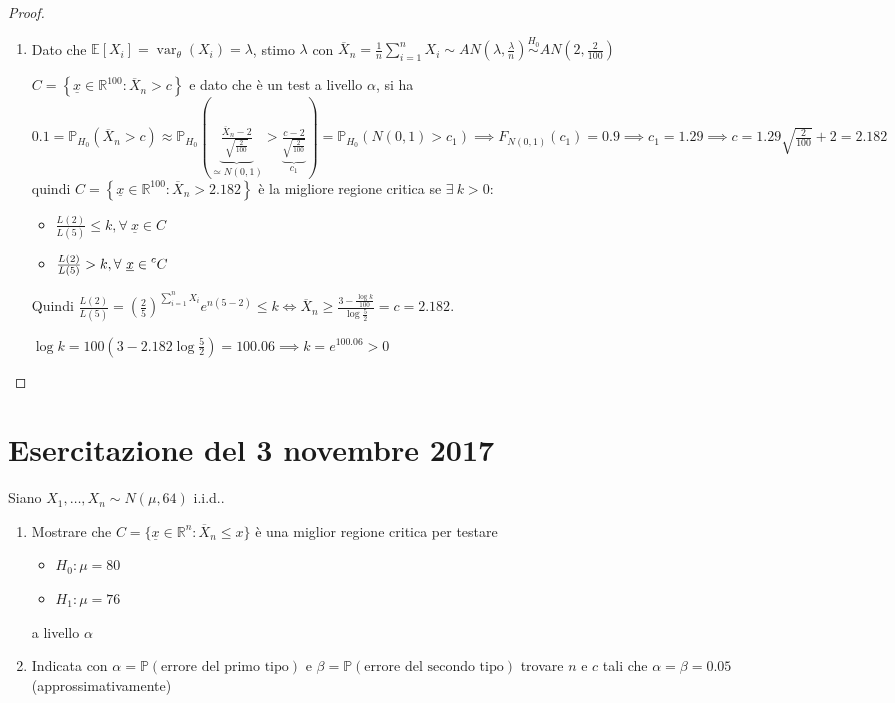 \documentclass[hidelinks, 10pt]{report}
\DeclareMathOperator{\var}{var}
\begin{document}
\begin{proof}
\noindent
\begin{enumerate}
\item Dato che $ \mathbb{E}[X_{i}] = \var_{\theta} (X_{i}) = \lambda $, stimo $ \lambda $ con $ \overline{X}_{n} = \frac{1}{n} \sum\limits_{i = 1}^{n} X_{i} \sim AN \left( \lambda, \frac{\lambda}{n} \right) \stackrel{H_{0}}{\sim} AN \left( 2, \frac{2}{100} \right) $

$ C = \left\{ \underline{x} \in \mathbb{R}^{100} : \overline{X}_{n} > c \right\} $ e dato che \`e un test a livello $ \alpha $, si ha $ 0.1 = \mathbb{P}_{H_{0}} (\overline{X}_{n} > c) \approx \mathbb{P}_{H_{0}} \left( \underbrace{\frac{\overline{X}_{n} - 2}{\sqrt{\frac{2}{100}}}}_{\simeq N(0,1)} > \underbrace{\frac{c - 2}{\sqrt{\frac{2}{100}}}}_{c_{1}} \right) = \mathbb{P}_{H_{0}} (N(0,1) > c_{1}) \implies F_{N(0,1)} (c_{1}) = 0.9 \implies c_{1} = 1.29 \implies c = 1.29 \sqrt{\frac{2}{100}} + 2 = 2.182 $ quindi $ C = \left\{ \underline{x} \in \mathbb{R}^{100} : \overline{X}_{n} > 2.182 \right\} $ \`e la migliore regione critica se $ \exists\ k > 0 : $
\begin{itemize}
\item $ \frac{L(2)}{L(5)} \le k, \forall\ \underline{x} \in C $
\item $ \frac{L(2)}{L(5)} > k, \forall\ \underline{x} \in \compl{C} $
\end{itemize}

Quindi $ \frac{L(2)}{L(5)} = \left( \frac{2}{5} \right)^{\sum\limits_{i = 1}^{n} X_{i}} e^{n(5 - 2)} \le k \iff \overline{X}_{n} \ge \frac{3 - \frac{\log k}{100}}{\log \frac{5}{2}} = c = 2.182 $.

$ \log k = 100 \left(3 - 2.182 \log \frac{5}{2} \right) = 100.06 \implies k = e^{100.06} > 0 $
\end{enumerate}
\end{proof}

\section{Esercitazione del 3 novembre 2017}
\begin{ex}
Siano $ X_{1}, \dotsc, X_{n} \sim N(\mu, 64) $ i.i.d..
\begin{enumerate}
\item Mostrare che $ C = \{ \underline{x} \in \mathbb{R}^{n} : \overline{X}_{n} \le x \} $ \`e una miglior regione critica per testare
\begin{itemize}
\item $ H_{0}: \mu = 80 $
\item $ H_{1}: \mu = 76 $
\end{itemize}
a livello $ \alpha $
\item Indicata con $ \alpha = \mathbb{P} (\text{errore del primo tipo}) $ e $ \beta = \mathbb{P} (\text{errore del secondo tipo}) $ trovare $ n $ e $ c $ tali che $ \alpha = \beta = 0.05 $ (approssimativamente)
\end{enumerate}
\end{ex}
\end{document}
